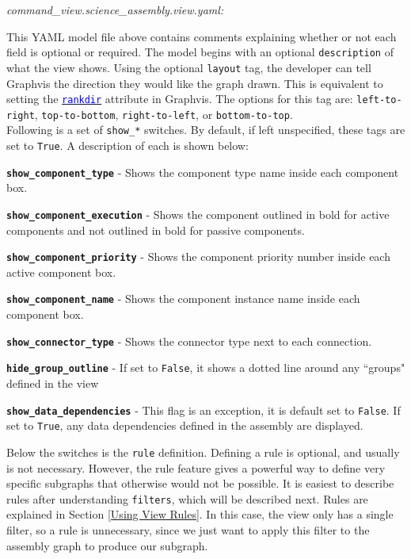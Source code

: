 \textit{command\_view.science\_assembly.view.yaml:}

This YAML model file above contains comments explaining whether or not each field is optional or required. The model begins with an optional \texttt{description} of what the view shows. Using the optional \texttt{layout} tag, the developer can tell Graphvis the direction they would like the graph drawn. This is equivalent to setting the \href{https://www.graphviz.org/doc/info/attrs.html#d:rankdir}{\textcolor{blue}{\texttt{rankdir}}} attribute in Graphvis. The options for this tag are: \texttt{left-to-right}, \texttt{top-to-bottom}, \texttt{right-to-left}, or \texttt{bottom-to-top}. \\

Following is a set of \texttt{show\_*} switches. By default, if left unspecified, these tags are set to \texttt{True}. A description of each is shown below:

\vspace{5mm} %
\begin{spaceditemize}
  \item \textbf{\texttt{show\_component\_type}} - Shows the component type name inside each component box.
  \item \textbf{\texttt{show\_component\_execution}} - Shows the component outlined in bold for active components and not outlined in bold for passive components.
  \item \textbf{\texttt{show\_component\_priority}} - Shows the component priority number inside each active component box.
  \item \textbf{\texttt{show\_component\_name}} - Shows the component instance name inside each component box.
  \item \textbf{\texttt{show\_connector\_type}} - Shows the connector type next to each connection.
  \item \textbf{\texttt{hide\_group\_outline}} - If set to \texttt{False}, it shows a dotted line around any ``groups" defined in the view
  \item \textbf{\texttt{show\_data\_dependencies}} - This flag is an exception, it is default set to \texttt{False}. If set to \texttt{True}, any data dependencies defined in the assembly are displayed.
\end{spaceditemize}
\vspace{5mm} %

Below the switches is the \texttt{rule} definition. Defining a rule is optional, and usually is not necessary. However, the rule feature gives a powerful way to define very specific subgraphs that otherwise would not be possible. It is easiest to describe rules after understanding \texttt{filters}, which will be described next. Rules are explained in Section \ref{Using View Rules}. In this case, the view only has a single filter, so a rule is unnecessary, since we just want to apply this filter to the assembly graph to produce our subgraph. \\

